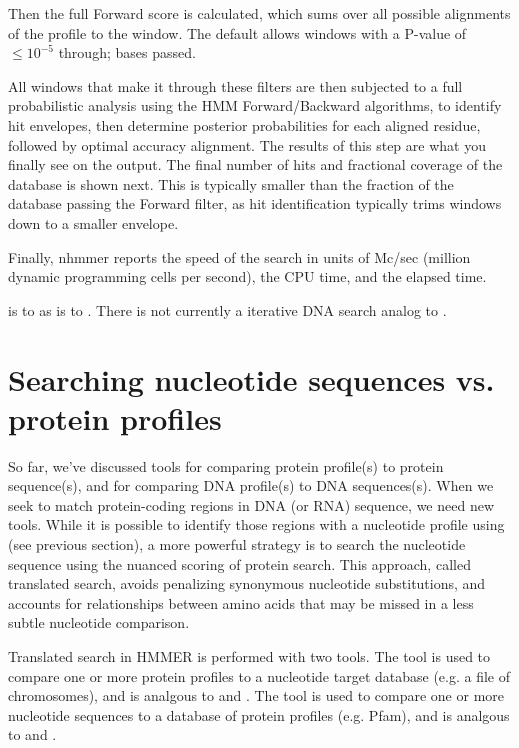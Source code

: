 Then the full Forward score is calculated, which sums over all
possible alignments of the profile to the window. The default allows
windows with a P-value of $\leq 10^{-5}$ through; \NMHnfwd{} bases
passed.

All windows that make it through these filters are then subjected to a
full probabilistic analysis using the HMM Forward/Backward algorithms,
to identify hit envelopes, then determine posterior probabilities for
each aligned residue, followed by optimal accuracy alignment. The
results of this step are what you finally see on the output. The final
number of hits and fractional coverage of the database is shown
next. This is typically smaller than the fraction of the database
passing the Forward filter, as hit identification typically trims
windows down to a smaller envelope.

Finally, nhmmer reports the speed of the search in units of Mc/sec
(million dynamic programming cells per second), the CPU time, and the
elapsed time.

 is to  as  is to
.  There is not currently a iterative DNA search
analog to .


\section{Searching nucleotide sequences vs. protein profiles}

So far, we've discussed tools for comparing protein profile(s) to
protein sequence(s), and for comparing DNA profile(s) to DNA
sequences(s). When we seek to match protein-coding regions in 
DNA (or RNA) sequence, we need new tools. While it is possible to 
identify those regions with a nucleotide profile using
 (see previous section), a more powerful strategy 
is to search the nucleotide sequence using the nuanced scoring of protein
search. This approach, called translated search, avoids penalizing synonymous 
nucleotide substitutions, and accounts for relationships between 
amino acids that may be missed in a less subtle nucleotide comparison. 

Translated search in HMMER is performed with two tools. The tool 
 is used to compare one or more protein profiles to a 
nucleotide target database (e.g. a file of chromosomes), and is 
analgous to  and . The tool 
 is used to compare one or more nucleotide 
sequences to a database of protein profiles (e.g. Pfam), and is 
analgous to  and .

